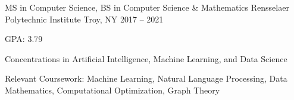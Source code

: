 


\begin{cventries}

  \cventry
  {MS in Computer Science, BS in Computer Science \& Mathematics}
	{Rensselaer Polytechnic Institute}
	{Troy, NY}
	{2017 – 2021}
  {
    \begin{cvitems}
      \item GPA: 3.79
      \item Concentrations in Artificial Intelligence, Machine Learning, and Data Science
      \item Relevant Coursework: Machine Learning, Natural Language Processing, Data Mathematics, Computational Optimization, Graph Theory
    \end{cvitems}
  }


\end{cventries}